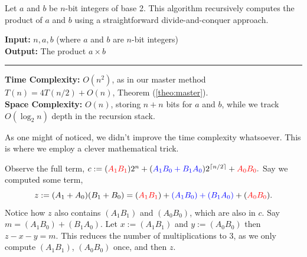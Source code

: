 \begin{Func}
    Let $a$ and $b$ be $n$-bit integers of base 2. This algorithm recursively computes the product of $a$ and $b$ using a straightforward divide-and-conquer approach.

    \vspace{.5em}
    \noindent
    \textbf{Input:} $n, a, b$ (where $a$ and $b$ are $n$-bit integers)\\
    \textbf{Output:} The product $a \times b$\\

    \begin{algorithm}[H]
        \SetAlgoLined
    \end{algorithm}
    \noindent\rule{\textwidth}{0.4pt}

    \noindent
    \textbf{Time Complexity:} $O(n^2)$, as in our master method $T(n)=4T(n/2)+O(n)$, Theorem (\ref{theo:master}).\\
    \textbf{Space Complexity:} $O(n)$, storing $n+n$ bits for $a$ and $b$, while we track $O(\log_2 n)$ depth in the recursion stack.
\end{Func}

\noindent
As one might of noticed, we didn't improve the time complexity whatsoever. This is where we employ a clever mathematical trick.
\newpage

\label{page:karatsuba}
\noindent
Observe the full term, $c:=(\textcolor{red}{A_1B_1})2^{n}+(\textcolor{blue}{A_1B_0+B_1A_0})2^{\lceil n/2\rceil}+\textcolor{red}{A_0B_0}.$ Say we computed some term,
\[z:=(A_1+A_0)(B_1+B_0)=(\textcolor{red}{A_1B_1})+\textcolor{blue}{(A_1B_0)+(B_1A_0)}+(\textcolor{red}{A_0B_0}).\]
\noindent
Notice how $z$ also contains $(A_1B_1)$ and $(A_0B_0)$, which are also in $c$. Say
$m=(A_1B_0)+(B_1A_0)$. Let $x:=(A_1B_1)$ and $y:=(A_0B_0)$ then $z-x-y=m$. This reduces the number of multiplications to 3, as we only compute
 $(A_1B_1)$, $(A_0B_0)$ once, and then $z$.\\

